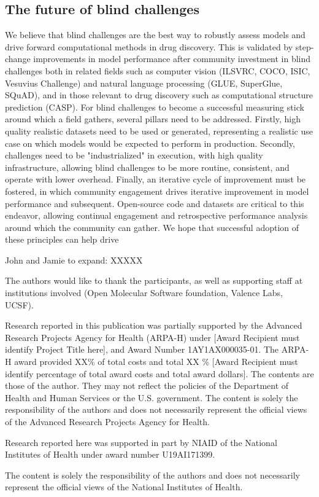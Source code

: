 \documentclass[journal=jcim,manuscript=article]{achemso}
\begin{document}
\subsection{The future of blind challenges}

We believe that blind challenges are the best way to robustly assess models and drive forward computational methods in drug discovery. This is validated by step-change improvements in model performance after community investment in blind challenges both in related fields such as computer vision (ILSVRC, COCO, ISIC, Vesuvius Challenge) and natural language processing (GLUE, SuperGlue,  SQuAD), and in those relevant to drug discovery such as computational structure prediction (CASP)\cite{casp13_2019, casp14_2021, casp15_2023}. For blind challenges to become a successful measuring stick around which a field gathers, several pillars need to be addressed. Firstly, high quality realistic datasets need to be used or generated, representing a realistic use case on which models would be expected to perform in production. Secondly, challenges need to be "industrialized" in execution, with high quality infrastructure, allowing blind challenges to be more routine, consistent, and operate with lower overhead. Finally, an iterative cycle of improvement must be fostered, in which community engagement drives iterative improvement in model performance and subsequent. Open-source code and datasets are critical to this endeavor, allowing continual engagement and retrospective performance analysis around which the community can gather. We hope that successful adoption of these principles can help drive

John and Jamie to expand: XXXXX



\begin{acknowledgement}

The authors would like to thank the participants, as well as supporting staff at institutions involved (Open Molecular Software foundation, Valence Labs, UCSF).


Research reported in this publication was partially supported by the Advanced Research Projects Agency for Health (ARPA-H) under [Award Recipient must identify Project Title here], and Award Number 1AY1AX000035-01. The ARPA-H award provided XX\% of total costs and total XX \% [Award Recipient must identify percentage of total award costs and total award dollars]. The contents are those of the author. They may not reflect the policies of the Department of Health and Human Services or the U.S. government. The content is solely the responsibility of the authors and does not necessarily represent the official views of the Advanced Research Projects Agency for Health.\


Research reported here was supported in part by NIAID of the National Institutes of Health under award number U19AI171399.

The content is solely the responsibility of the authors and does not necessarily represent the official views of the National Institutes of Health.

\end{acknowledgement}
\end{document}
